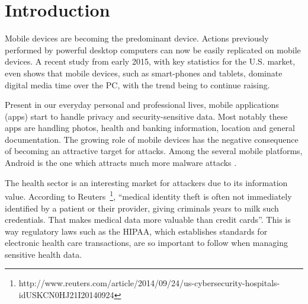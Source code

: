 
% 
% 
\section{Introduction}



Mobile devices are becoming the predominant device. Actions previously performed by powerful desktop computers can now be easily replicated on mobile devices. A recent study \cite{comscore} from early 2015, with key statistics for the U.S. market, even shows that mobile devices, such as smart-phones and tablets, dominate digital media time over the \ac{PC}, with the trend being to continue raising.

Present in our everyday personal and professional lives, mobile applications (apps) start to handle privacy and security-sensitive data. Most notably these apps are handling photos, health and banking information, location and general documentation. The growing role of mobile devices has the negative consequence of becoming an attractive target for attacks. Among the several mobile platforms, Android is the one which attracts much more malware attacks \cite{fsecure}.


The health sector is an interesting market for attackers due to its information value. According to Reuters~\footnote{http://www.reuters.com/article/2014/09/24/us-cybersecurity-hospitals-idUSKCN0HJ21I20140924}, ``medical identity theft is often not immediately identified by a patient or their provider, giving criminals years to milk such credentials. That makes medical data more valuable than credit cards''. This is way regulatory laws such as the \ac{HIPAA}, which establishes standards for electronic health care transactions, are so important to follow when managing sensitive health data.

